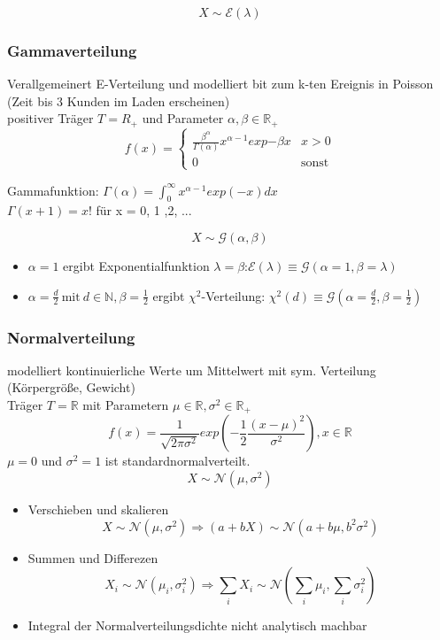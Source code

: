 \documentclass[10pt,a4paper,landscape]{article}
\begin{document}
\begin{multicols}{4}
\[
X \sim \mathcal{E}(\lambda)
\]

\subsubsection{Gammaverteilung}
Verallgemeinert E-Verteilung und modelliert bit zum k-ten Ereignis in Poisson (Zeit bis 3 Kunden im Laden erscheinen)\\
positiver Träger $T=R_+$ und Parameter $\alpha , \beta \in \mathbb{R}_+$
\[
f(x) = \begin{cases}
\frac{\beta^{\alpha}}{\Gamma (\alpha)}x^{\alpha -1}exp{-\beta x} &x>0 \\
0 &\text{sonst}
\end{cases}
\]

Gammafunktion: $\Gamma(\alpha)= \int_0^{\infty}x^{\alpha -1}exp(-x)dx$ \\
$\Gamma (x+1)=x!$ für x = 0, 1 ,2, ...

\[
X \sim \mathcal{G}(\alpha , \beta)
\]

\begin{itemize}
\item $\alpha = 1$ ergibt Exponentialfunktion $\lambda = \beta$:$\mathcal{E}(\lambda)\equiv \mathcal{G}(\alpha =1, \beta = \lambda)$
\item $\alpha = \frac{d}{2} ~\text{mit}~ d \in \mathbb{N}, \beta = \frac{1}{2}$ ergibt $\chi^2$-Verteilung: $\chi^2(d) \equiv \mathcal{G}(\alpha = \frac{d}{2}, \beta = \frac{1}{2})$
\end{itemize}

\subsubsection{Normalverteilung}
modelliert kontinuierliche Werte um Mittelwert mit sym. Verteilung (Körpergröße, Gewicht) \\
Träger $T=\mathbb{R}$ mit Parametern $\mu \in \mathbb{R}, \sigma^2 \in \mathbb{R}_+$
\[
f(x)=\frac{1}{\sqrt{2 \pi \sigma^2}}exp\left(-\frac{1}{2}\frac{(x-\mu)^2}{\sigma^2}\right), x\in \mathbb{R}
\]
$\mu = 0$ und $\sigma^2 = 1$ ist standardnormalverteilt.
\[
X \sim \mathcal{N}(\mu , \sigma^2)
\]

\begin{itemize}
\item Verschieben und skalieren
\[
X \sim \mathcal{N}(\mu , \sigma^2) \Rightarrow (a+bX) \sim \mathcal{N}(a+b\mu ,b^2 \sigma^2)
\]
\item Summen und Differezen
\[
X_i \sim \mathcal{N}(\mu_i , \sigma^2_i) \Rightarrow \sum_i X_i \sim \mathcal{N}(\sum_i \mu_i , \sum_i \sigma^2_i)
\]
\item Integral der Normalverteilungsdichte nicht analytisch machbar
\end{itemize}


\end{multicols}
\end{document}
